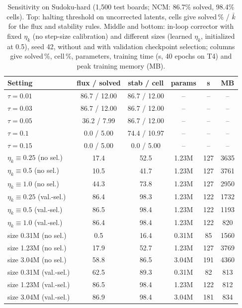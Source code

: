 \begin{table}[t]
\centering
\caption{Sensitivity on Sudoku-hard (1{,}500 test boards; NCM: 86.7\% solved, 98.4\% cells). Top: halting threshold on uncorrected latents, cells give solved\,\% / $\bar k$ for the flux and stability rules. Middle and bottom: in-loop corrector with fixed $\eta_k$ (no step-size calibration) and different sizes (learned $\eta_k$, initialized at 0.5), seed 42, without and with validation checkpoint selection; columns give solved\,\%, cell\,\%, parameters, training time (s, 40 epochs on T4) and peak training memory (MB).}
\label{tab:sens}
\setlength{\tabcolsep}{2.4pt}
\begin{tabular}{lccccc}
\toprule
Setting & flux / solved & stab / cell & params & s & MB\\
\midrule
$\tau=0.01$ & 86.7 / 12.00 & 86.7 / 12.00 & -- & -- & --\\
$\tau=0.03$ & 86.7 / 12.00 & 86.7 / 12.00 & -- & -- & --\\
$\tau=0.05$ & 36.2 / 7.99 & 86.7 / 12.00 & -- & -- & --\\
$\tau=0.1$ & 0.0 / 5.00 & 74.4 / 10.97 & -- & -- & --\\
$\tau=0.15$ & 0.0 / 5.00 & 0.0 / 5.00 & -- & -- & --\\
\midrule
$\eta_k\equiv0.25$ (no sel.) & 17.4 & 52.5 & 1.23M & 127 & 3635\\
$\eta_k\equiv0.5$ (no sel.) & 10.5 & 41.7 & 1.23M & 127 & 3761\\
$\eta_k\equiv1.0$ (no sel.) & 44.3 & 73.8 & 1.23M & 127 & 2950\\
$\eta_k\equiv0.25$ (val.-sel.) & 86.4 & 98.3 & 1.23M & 122 & 1732\\
$\eta_k\equiv0.5$ (val.-sel.) & 86.5 & 98.4 & 1.23M & 122 & 1193\\
$\eta_k\equiv1.0$ (val.-sel.) & 86.4 & 98.4 & 1.23M & 122 & 820\\
\midrule
size 0.31M (no sel.) & 0.5 & 16.4 & 0.31M & 85 & 1560\\
size 1.23M (no sel.) & 17.9 & 52.7 & 1.23M & 127 & 3769\\
size 3.04M (no sel.) & 58.8 & 86.5 & 3.04M & 191 & 4360\\
size 0.31M (val.-sel.) & 62.5 & 89.3 & 0.31M & 82 & 813\\
size 1.23M (val.-sel.) & 86.5 & 98.4 & 1.23M & 122 & 812\\
size 3.04M (val.-sel.) & 86.9 & 98.4 & 3.04M & 181 & 834\\
\bottomrule
\end{tabular}
\end{table}
